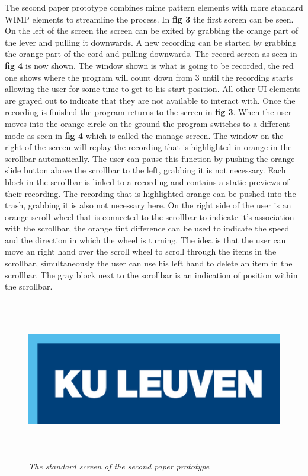 The second paper prototype combines mime pattern elements with more standard WIMP elements to streamline the process. In \textbf{ fig 3} the first screen can be seen. On the left of the screen the screen can be exited by grabbing the orange part of the lever and pulling it downwards. A new recording can be started by grabbing the orange part of the cord and pulling downwards. The record screen as seen in \textbf{ fig 4} is now shown. The window shown is what is going to be recorded, the red one shows where the program will count down from 3 until the recording starts allowing the user for some time to get to his start position. All other UI elements are grayed out to indicate that they are not available to interact with. Once the recording is finished the program returns to the screen in \textbf{ fig 3}. When the user moves into the orange circle on the ground the program switches to a different mode as seen in \textbf{ fig 4} which is called the manage screen. The window on the right of the screen will replay the recording that is highlighted in orange in the scrollbar automatically. The user can pause this function by pushing the orange slide button above the scrollbar to the left, grabbing it is not necessary. Each block in the scrollbar is linked to a recording and contains a static previews of their recording. The recording that is highlighted orange can be pushed into the trash, grabbing it is also not necessary here. On the right side of the user is an orange scroll wheel that is connected to the scrollbar to indicate it's association with the scrollbar, the orange tint difference can be used to indicate the speed and the direction in which the wheel is turning. The idea is that the user can move an right hand over the scroll wheel to scroll through the items in the scrollbar, simultaneously the user can use his left hand to delete an item in the scrollbar. The gray block next to the scrollbar is an indication of position within the scrollbar.

\begin{figure}[H]
	\begin{center}
		\includegraphics[width=12.5cm, height=7cm]{KUL.png}
		\caption{\emph{The standard screen of the second paper prototype}}
		\label{The standard screen of the second paper prototype}
	\end{center}
\end{figure}

